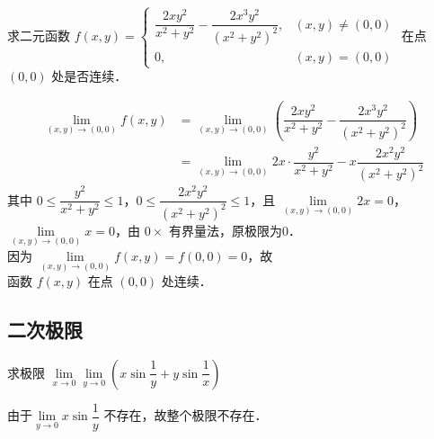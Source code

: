 \documentclass[12pt, a4paper, oneside, UTF8]{ctexbook}
\begin{document}
\begin{example}
    求二元函数 $f(x,y) = \begin{cases}
        \dfrac{2xy^2}{x^2+y^2}-\dfrac{2x^3y^2}{(x^2+y^2)^2}, & (x,y) \neq (0,0) \\
        0, & (x,y) = (0,0)
    \end{cases}$ 在点 $(0,0)$ 处是否连续．
\end{example}
\begin{solution}
    \begin{align*}
        \lim\limits_{(x,y) \to (0,0)} f(x,y) & = \lim\limits_{(x,y) \to (0,0)} \left( \dfrac{2xy^2}{x^2+y^2}-\dfrac{2x^3y^2}{(x^2+y^2)^2} \right) \\
        & = \lim\limits_{(x,y) \to (0,0)} 2x\cdot\dfrac{y^2}{x^2+y^2}-x\dfrac{2x^2y^2}{(x^2+y^2)^2}
    \end{align*}
    其中 $0 \leq \dfrac{y^2}{x^2+y^2} \leq 1$，$0 \leq \dfrac{2x^2y^2}{(x^2+y^2)^2} \leq 1$，且 $\lim\limits_{(x,y) \to (0,0)} 2x = 0$，$\lim\limits_{(x,y) \to (0,0)} x = 0$，由 $0 \times$ 有界量法，原极限为0．\\
    因为 $\lim\limits_{(x,y) \to (0,0)} f(x,y) = f(0,0) = 0$，故$\boxed{\text{函数 } f(x,y) \text{ 在点 } (0,0) \text{ 处连续}}$．
\end{solution}
\subsection{二次极限}
\begin{example}
    求极限 $\lim\limits_{x \to 0}\lim\limits_{y \to 0} (x\sin\dfrac{1}{y}+y\sin\dfrac{1}{x})$
\end{example}
\begin{solution}
    由于$\lim\limits_{y \to 0} x\sin\dfrac{1}{y}$ 不存在，故整个极限$\boxed{\text{不存在}}$．
\end{solution}
\ifx\allfiles\undefined
\end{document}
